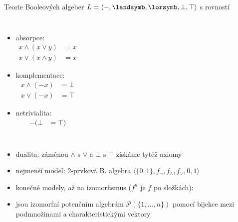 \documentclass{beamer}
\begin{document}
\begin{frame}{Teorie Booleových algeber \hfill $L=\langle -,\landsymb,\lorsymb,\bot,\top\rangle$ s rovností}
{\begin{columns}
        \begin{itemize}
            \item \alert{absorpce}:
            \vspace{-9pt}\begin{align*}
                x\land(x\lor y) &= x\\
                x\lor(x\land y) &= x
            \end{align*}\vspace{-24pt}
            \item \alert{komplementace}:
            \vspace{-9pt}\begin{align*}
                x\land(-x) &= \bot \\
                x\lor(-x) &= \top
            \end{align*}\vspace{-24pt}
            \item \alert{netrivialita}:
            \vspace{-9pt}\begin{align*}
                -(\bot &= \top)
            \end{align*}
        \end{itemize}
                

    \end{columns}
    \vspace{9pt}
    }

    \begin{itemize}
        \item dualita: záměnou $\land$ s $\lor$ a $\bot$ s $\top$ získáme tytéž axiomy    
        \item nejmenší model: \alert{2-prvková B. algebra} $\langle \{0,1\},f_\neg,f_\land,f_\lor,0,1\rangle$
        \item konečné modely, až na \alert{izomorfismus} ($f^n$ je $f$ po složkách):
        
        \item jsou izomorfní \alert{potenčním algebrám} $\mathcal P(\{1,\dots,n\})$ pomocí bijekce mezi podmnožinami a  charakteristickými vektory
    \end{itemize}
    
\end{frame}
\end{document}
